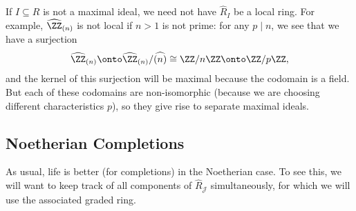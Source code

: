 \begin{remark}[Nir]
	If $I\subseteq R$ is not a maximal ideal, we need not have $\widehat R_I$ be a local ring. For example, $\widehat\ZZ_{(n)}$ is not local if $n>1$ is not prime: for any $p\mid n$, we see that we have a surjection
	\[\widehat\ZZ_{(n)}\onto\widehat\ZZ_{(n)}/\widehat{(n)}\cong\ZZ/n\ZZ\onto\ZZ/p\ZZ,\]
	and the kernel of this surjection will be maximal because the codomain is a field. But each of these codomains are non-isomorphic (because we are choosing different characteristics $p$), so they give rise to separate maximal ideals.
\end{remark}

\subsection{Noetherian Completions}
As usual, life is better (for completions) in the Noetherian case. To see this, we will want to keep track of all components of $\widehat R_\mathcal J$ simultaneously, for which we will use the associated graded ring.

